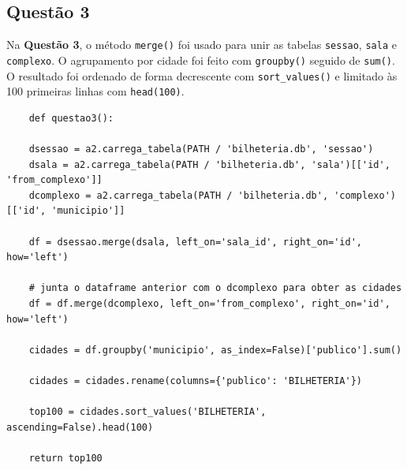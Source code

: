 \documentclass{article}
\begin{document}
\linespread{1.5}
\pagebreak
\subsection*{Questão 3}
Na \textbf{Questão 3}, o método \texttt{merge()} foi usado para unir as tabelas \texttt{sessao}, \texttt{sala} e \texttt{complexo}. O agrupamento por cidade foi feito com \texttt{groupby()} seguido de \texttt{sum()}. O resultado foi ordenado de forma decrescente com \texttt{sort\_values()} e limitado às 100 primeiras linhas com \texttt{head(100)}.
\linespread{1}
\begin{lstlisting}
    def questao3():
    
    dsessao = a2.carrega_tabela(PATH / 'bilheteria.db', 'sessao')
    dsala = a2.carrega_tabela(PATH / 'bilheteria.db', 'sala')[['id', 'from_complexo']]
    dcomplexo = a2.carrega_tabela(PATH / 'bilheteria.db', 'complexo')[['id', 'municipio']]

    df = dsessao.merge(dsala, left_on='sala_id', right_on='id', how='left')

    # junta o dataframe anterior com o dcomplexo para obter as cidades
    df = df.merge(dcomplexo, left_on='from_complexo', right_on='id', how='left')

    cidades = df.groupby('municipio', as_index=False)['publico'].sum()

    cidades = cidades.rename(columns={'publico': 'BILHETERIA'})

    top100 = cidades.sort_values('BILHETERIA', ascending=False).head(100)

    return top100
\end{lstlisting}
\linespread{1.5}
\end{document}
